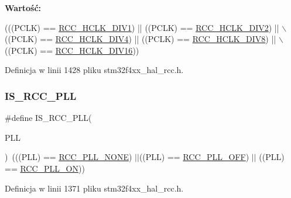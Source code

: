 {\bfseries Wartość\+:}
\begin{DoxyCode}
(((PCLK) == \hyperlink{group___r_c_c___a_p_b1___a_p_b2___clock___source_ga8e3fcdef0e5d77bb61a52420fe1e9fbc}{RCC\_HCLK\_DIV1}) || ((PCLK) == \hyperlink{group___r_c_c___a_p_b1___a_p_b2___clock___source_ga4d2ebcf280d85e8449a5fb7b994b5169}{RCC\_HCLK\_DIV2}) || \(\backslash\)
                           ((PCLK) == \hyperlink{group___r_c_c___a_p_b1___a_p_b2___clock___source_ga85b5f4fd936e22a3f4df5ed756f6e083}{RCC\_HCLK\_DIV4}) || ((PCLK) == 
      \hyperlink{group___r_c_c___a_p_b1___a_p_b2___clock___source_gadb18bc60e2c639cb59244bedb54f7bb3}{RCC\_HCLK\_DIV8}) || \(\backslash\)
                           ((PCLK) == \hyperlink{group___r_c_c___a_p_b1___a_p_b2___clock___source_ga27ac27d48360121bc2dc68b99dc8845d}{RCC\_HCLK\_DIV16}))
\end{DoxyCode}


Definicja w linii 1428 pliku stm32f4xx\+\_\+hal\+\_\+rcc.\+h.

\mbox{\label{group___r_c_c___i_s___r_c_c___definitions_ga373b85039eb8036373fe80948c153ee0}} 
\subsubsection{\texorpdfstring{I\+S\+\_\+\+R\+C\+C\+\_\+\+P\+LL}{IS\_RCC\_PLL}}
{\footnotesize\ttfamily \#define I\+S\+\_\+\+R\+C\+C\+\_\+\+P\+LL(\begin{DoxyParamCaption}\item[{}]{P\+LL }\end{DoxyParamCaption})~(((P\+LL) == \hyperlink{group___r_c_c___p_l_l___config_gae47a612f8e15c32917ee2181362d88f3}{R\+C\+C\+\_\+\+P\+L\+L\+\_\+\+N\+O\+NE}) $\vert$$\vert$((P\+LL) == \hyperlink{group___r_c_c___p_l_l___config_ga3a8d5c8bcb101c6ca1a574729acfa903}{R\+C\+C\+\_\+\+P\+L\+L\+\_\+\+O\+FF}) $\vert$$\vert$ ((P\+LL) == \hyperlink{group___r_c_c___p_l_l___config_gaf86dbee130304ba5760818f56d34ec91}{R\+C\+C\+\_\+\+P\+L\+L\+\_\+\+ON}))}



Definicja w linii 1371 pliku stm32f4xx\+\_\+hal\+\_\+rcc.\+h.

